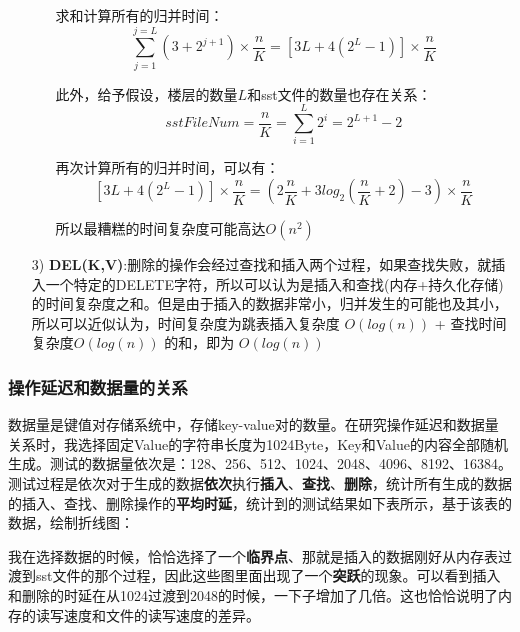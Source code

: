 \documentclass[fontset=windows]{article}
\begin{document}
\begin{itemize}
\begin{itemize}
    求和计算所有的归并时间：
    $$\sum_{j = 1}^{j= L} (3 + 2^{j+1}) \times \frac{n}{K} = [3L + 4(2^L - 1)] \times \frac{n}{K}$$
    
    此外，给予假设，楼层的数量$L$和sst文件的数量也存在关系：
    $$ sstFileNum = \frac{n}{K} = \sum_{i=1}^{L}2^i = 2^{L+1} - 2 $$
    
    再次计算所有的归并时间，可以有：
    $$[3L + 4(2^L - 1)] \times \frac{n}{K} = (2\frac{n}{K} +3log_2(\frac{n}{K} + 2) - 3) \times \frac{n}{K} $$
    
    所以最糟糕的时间复杂度可能高达$O(n^2)$
    \end{itemize}
    
    \item [3)] \textbf{DEL(K,V)}:删除的操作会经过查找和插入两个过程，如果查找失败，就插入一个特定的DELETE字符，所以可以认为是插入和查找(内存+持久化存储)的时间复杂度之和。但是由于插入的数据非常小，归并发生的可能也及其小，所以可以近似认为，时间复杂度为跳表插入复杂度 $O(log(n))$ + 查找时间复杂度$O(log(n))$ 的和，即为 $O(log(n))$
    

\end{itemize}


\subsubsection{操作延迟和数据量的关系}

数据量是键值对存储系统中，存储key-value对的数量。在研究操作延迟和数据量关系时，我选择固定Value的字符串长度为1024Byte，Key和Value的内容全部随机生成。测试的数据量依次是：128、256、512、1024、2048、4096、8192、16384。测试过程是依次对于生成的数据\textbf{依次}执行\textbf{插入}、\textbf{查找}、\textbf{删除}，统计所有生成的数据的插入、查找、删除操作的\textbf{平均时延}，统计到的测试结果如下表所示，基于该表的数据，绘制折线图：

我在选择数据的时候，恰恰选择了一个\textbf{临界点}、那就是插入的数据刚好从内存表过渡到sst文件的那个过程，因此这些图里面出现了一个\textbf{突跃}的现象。可以看到插入和删除的时延在从1024过渡到2048的时候，一下子增加了几倍。这也恰恰说明了内存的读写速度和文件的读写速度的差异。
\end{document}
